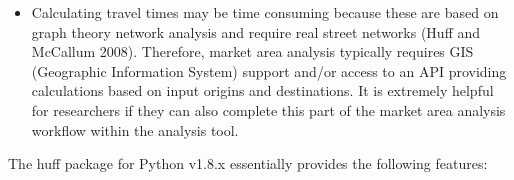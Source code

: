 \documentclass[
]{article}
\begin{document}
\begin{itemize}
  within the market area analysis workflow, several weighting functions
  are available, and that there are options to compare different model
  specifications based on fit metrics.
\item
  Calculating travel times may be time consuming because these are based
  on graph theory network analysis and require real street networks
  (Huff and McCallum 2008). Therefore, market area analysis typically
  requires GIS (Geographic Information System) support and/or access to
  an API providing calculations based on input origins and destinations.
  It is extremely helpful for researchers if they can also complete this
  part of the market area analysis workflow within the analysis tool.
\end{itemize}

The huff package for Python v1.8.x essentially provides the following
features:
\end{document}
